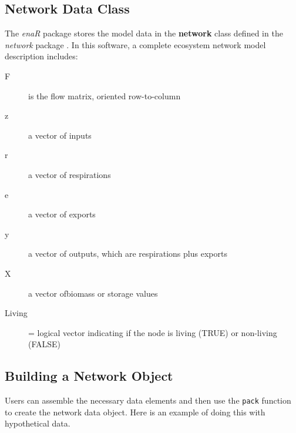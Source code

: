 \documentclass[article]{jss}
\begin{document}
\subsection{Network Data Class}

The \textit{enaR} package stores the model data in the
\textbf{network} class defined in the \textit{network} package
\citep[see][for details]{butts08_network}. In this software, a
complete ecosystem network model description includes:

\begin{description}
\item[F] is the flow matrix, oriented row-to-column
\item[z] a vector of inputs
\item[r] a vector of respirations
\item[e] a vector of exports
\item[y] a vector of outputs, which are respirations plus exports
\item[X] a vector ofbiomass or storage values
\item[Living] = logical vector indicating if the node is living
  (TRUE) or non-living (FALSE)
\end{description}

\subsection{Building a Network Object}

Users can assemble the necessary data elements and then use the
\texttt{pack} function to create the network data object.  Here is an
example of doing this with hypothetical data.
\end{document}
